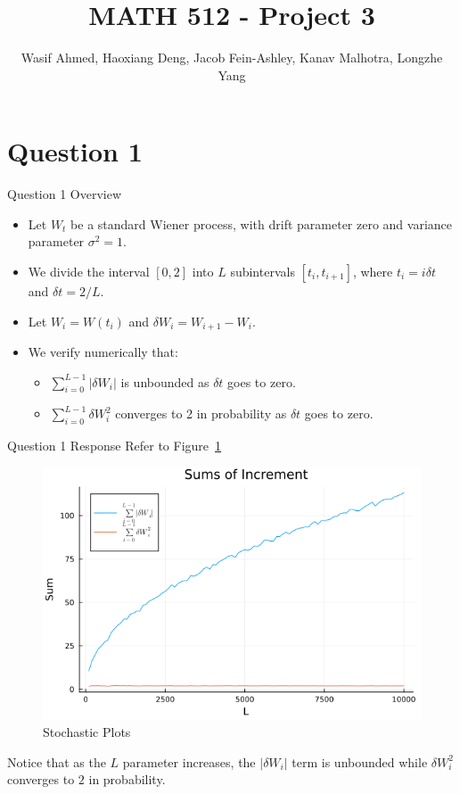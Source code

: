 \documentclass[compress,12pt]{beamer}
\title{MATH 512 - Project 3}
\subtitle{}
\date{}
\author{Wasif Ahmed, Haoxiang Deng, Jacob Fein-Ashley, Kanav Malhotra, Longzhe Yang}
\begin{document}
\frame[plain]{\titlepage}

\section{Question 1}



\begin{frame}{Question 1 Overview}
      \begin{itemize}
            \item Let $W_t$ be a standard Wiener process, with drift parameter zero and variance parameter $\sigma^2 = 1$.
            \item We divide the interval $[0,2]$ into $L$ subintervals $[t_i, t_{i+1}]$, where $t_i = i\delta t$ and $\delta t = 2/L$.
            \item Let $W_i = W(t_i)$ and $\delta W_i = W_{i+1} - W_i$.
            \item We verify numerically that:
            \begin{itemize}
                  \item $\sum_{i=0}^{L-1} |\delta W_i|$ is unbounded as $\delta t$ goes to zero.
                  \item $\sum_{i=0}^{L-1} \delta W_i^2$ converges to 2 in probability as $\delta t$ goes to zero.
            \end{itemize}
      \end{itemize}
      
\end{frame}

\begin{frame}{Question 1 Response}
      Refer to Figure~\ref{fig:convergence1}

      \begin{figure}[H]
      \centering
      \includegraphics[scale=0.32]{imgs/convergence1.png}
      \caption{Stochastic Plots}
      \label{fig:convergence1}
      \end{figure}

Notice that as the $L$ parameter increases, the $|\delta W_i|$ term is unbounded while $\delta W_i^2$ converges to $2$ in probability.
\end{frame}
\end{document}
